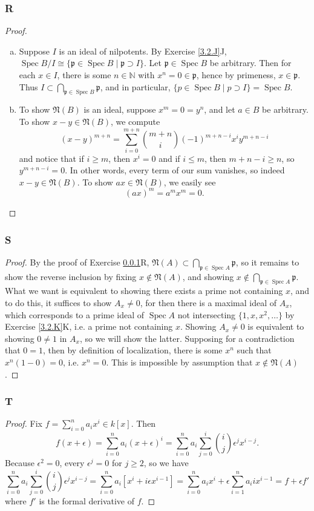 \documentclass{article}
\newcommand{\N}{\mathbb{N}}
\newcommand{\frkp}{\mathfrak{p}}
\newcommand{\frkN}{\mathfrak{N}}
\DeclareMathOperator{\Spec}{\mathrm{Spec}}
\begin{document}
\subsubsection{R}\label{3.2.R}
\begin{proof}
    \begin{enumerate}[(a)]
        \item Suppose $I$ is an ideal of nilpotents. By Exercise \ref{3.2.J}J, $\Spec B/I \cong \{\frkp \in \Spec B\mid \frkp \supset I \}$. Let $\frkp \in \Spec B$ be arbitrary. Then for each $x\in I$, there is some $n\in \N$ with $x^n=0 \in \frkp$, hence by primeness, $x\in \frkp$. Thus $I\subset \bigcap_{\frkp \in \Spec B} \frkp$, and in particular, $\{p\in \Spec B \mid p\supset I\} = \Spec B$.
        \item To show $\frkN(B)$ is an ideal, suppose $x^m=0=y^n$, and let $a\in B$ be arbitrary. To show $x-y\in \frkN(B)$, we compute
        \[
        (x-y)^{m+n}=\sum_{i=0}^{m+n} \binom{m+n}{i}(-1)^{m+n-i} x^i y^{m+n-i}
        \]
        and notice that if $i\geq m$, then $x^i=0$ and if $i\le m$, then $m+n-i\ge n$, so $y^{m+n-i}=0$. In other words, every term of our sum vanishes, so indeed $x-y\in \frkN(B)$. To show $ax\in \frkN(B)$, we easily see
        \[
        (ax)^m=a^m x^m =0.
        \]
    \end{enumerate}
\end{proof}
\subsubsection{S}\label{3.2.S}
\begin{proof}
    By the proof of Exercise \ref{3.2.R}R, $\frkN(A)\subset \bigcap_{\frkp\in \Spec A} \frkp$, so it remains to show the reverse inclusion by fixing $x\notin \frkN(A)$, and showing $x\notin \bigcap_{\frkp\in \Spec A} \frkp$. What we want is equivalent to showing there exists a prime not containing $x$, and to do this, it suffices to show $A_x \ne 0$, for then there is a maximal ideal of $A_x$, which corresponds to a prime ideal of $\Spec A$ not intersecting $\{1,x,x^2,\dots \}$ by Exercise \ref{3.2.K}K, i.e. a prime not containing $x$. Showing $A_x\ne 0$ is equivalent to showing $0\ne 1$ in $A_x$, so we will show the latter. Supposing for a contradiction that $0=1$, then by definition of localization, there is some $x^n$ such that $x^n(1-0)=0$, i.e. $x^n=0$. This is impossible by assumption that $x\notin \frkN(A)$.
\end{proof}
\subsubsection{T}\label{3.2.T}
\begin{proof}
    Fix $f=\sum_{i=0}^n a_i x^i \in k[x]$. Then
    \[
    f(x+\epsilon)=\sum_{i=0}^n a_i (x+\epsilon)^i = \sum_{i=0}^n a_i \sum_{j=0}^i \binom{i}{j}  \epsilon^j x^{i-j}.
    \]
    Because $\epsilon^2=0$, every $\epsilon^j=0$ for $j\ge 2$, so we have
    \[
    \sum_{i=0}^n a_i \sum_{j=0}^i \binom{i}{j}  \epsilon^j x^{i-j}=\sum_{i=0}^n a_i \left[ x^i + i\epsilon x^{i-1} \right]=\sum_{i=0}^n a_i x^i +\epsilon \sum_{i=1}^n a_i i x^{i-1}=f+\epsilon f'
    \]
    where $f'$ is the formal derivative of $f$.
\end{proof}
\end{document}
